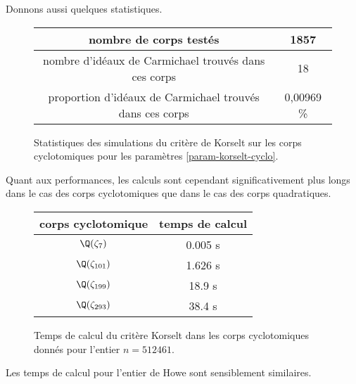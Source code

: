 Donnons aussi quelques statistiques.

\begin{figure}[h!]
	\begin{center}
		\begin{tabular}{|c|c|}
			\hline
			nombre de corps testés & 1857 \\\hline
			nombre d'idéaux de Carmichael trouvés dans ces corps & 18 \\\hline
			proportion d'idéaux de Carmichael trouvés dans ces corps & 0,00969 \% \\\hline
		\end{tabular}
		\caption{Statistiques des simulations du critère de Korselt sur les corps cyclotomiques pour les paramètres \ref{param-korselt-cyclo}.}
	\end{center}
\end{figure}

Quant aux performances, les calculs sont cependant significativement plus longs dans le cas des corps cyclotomiques que dans le cas des corps quadratiques.  

\begin{figure}[h!]
	\begin{center}
		\begin{tabular}{|c|c|}
			\hline
			corps cyclotomique & temps de calcul \\
			\hline
			\hline
			$\Q(\zeta_7)$ & 0.005 s \\\hline
			$\Q(\zeta_{101})$ & 1.626 s \\\hline
			$\Q(\zeta_{199})$ & 18.9 s \\\hline
			$\Q(\zeta_{293})$ & 38.4 s \\\hline
		\end{tabular}
		\caption{Temps de calcul du critère Korselt dans les corps cyclotomiques donnés pour l'entier $n=512461$.}
	\end{center}
\end{figure}

Les temps de calcul pour l'entier de Howe sont sensiblement similaires.
